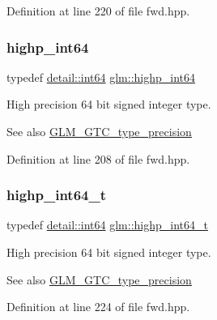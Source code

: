 Definition at line 220 of file fwd.\+hpp.

\mbox{\label{group__gtc__type__precision_ga7ffb27943e9569800979081bc548621c}} 
\subsubsection{\texorpdfstring{highp\_int64}{highp\_int64}}
{\footnotesize\ttfamily typedef \mbox{\hyperlink{namespaceglm_1_1detail_a5b1c3227ec636c24a0676746381adfc8}{detail\+::int64}} \mbox{\hyperlink{group__gtc__type__precision_ga7ffb27943e9569800979081bc548621c}{glm\+::highp\+\_\+int64}}}

High precision 64 bit signed integer type. \begin{DoxySeeAlso}{See also}
\mbox{\hyperlink{group__gtc__type__precision}{G\+L\+M\+\_\+\+G\+T\+C\+\_\+type\+\_\+precision}} 
\end{DoxySeeAlso}


Definition at line 208 of file fwd.\+hpp.

\mbox{\label{group__gtc__type__precision_ga0f5186bde44471133b08057cae8a51ac}} 
\subsubsection{\texorpdfstring{highp\_int64\_t}{highp\_int64\_t}}
{\footnotesize\ttfamily typedef \mbox{\hyperlink{namespaceglm_1_1detail_a5b1c3227ec636c24a0676746381adfc8}{detail\+::int64}} \mbox{\hyperlink{group__gtc__type__precision_ga0f5186bde44471133b08057cae8a51ac}{glm\+::highp\+\_\+int64\+\_\+t}}}

High precision 64 bit signed integer type. \begin{DoxySeeAlso}{See also}
\mbox{\hyperlink{group__gtc__type__precision}{G\+L\+M\+\_\+\+G\+T\+C\+\_\+type\+\_\+precision}} 
\end{DoxySeeAlso}


Definition at line 224 of file fwd.\+hpp.

\mbox{\label{group__gtc__type__precision_ga57c86999e666760c304453f9bfdc09d1}} 
